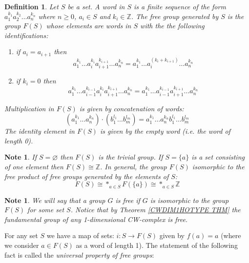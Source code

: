\documentclass[11pt, letterpaper, oneside]{report}
\theoremstyle{pplain}
\theoremstyle{ddefinition}
\newtheorem{definition}[theorem]{Definition}
\newtheorem{note}[theorem]{Note}
\theoremstyle{nnn}
\theoremstyle{eexercise}
\newcommand{\Z}{{\mathbb Z}}
\newcommand{\benu}{\begin{enumerate}}
\newcommand{\eenu}{\end{enumerate}}
\begin{document}
\begin{definition}
Let $S$ be a set. A \emph{word} in $S$ is a finite sequence of the form
$a_{1}^{k_{1}}a_{2}^{k_{2}} {\dots} a_{n}^{k_{n}}$
where $n\geq 0$,  $a_{i}\in S$ and $k_{i}\in \Z$. 
The \emph{free group generated by } $S$ is the group $F(S)$ whose elements
are words in $S$ with the the following identifications:
\benu
\item[\textbullet] if $a_{i} = a_{i+1}$ then
$$a_{1}^{k_{1}} {\dots}  a^{k_{i}}_{i} a^{k_{i+1}}_{i+1} {\dots} a_{n}^{k_{n}} = 
a_{1}^{k_{1}} {\dots} a_{i}^{(k_{i}+k_{i+1})} {\dots} a_{n}^{k_{n}}$$
\item[\textbullet] if $k_{i} = 0$ then 
$$a_{1}^{k_{1}} {\dots}  a_{i-1}^{k_{i-1}}a^{k_{i}}_{i} a^{k_{i+1}}_{i+1} {\dots} a_{n}^{k_{n}} = 
a_{1}^{k_{1}} {\dots}  a_{i-1}^{k_{i-1}}a^{k_{i+1}}_{i+1} {\dots} a_{n}^{k_{n}}$$
\eenu
Multiplication in $F(S)$ is given by concatenation of words: 
$$(a_{1}^{k_{1}}\dots a_{n}^{k_{n}})\cdot (b_{1}^{l_{1}}\dots b_{m}^{l_{m}}) = 
a_{1}^{k_{1}}\dots a_{n}^{k_{n}}b_{1}^{l_{1}}\dots b_{m}^{l_{m}}$$
The identity element in $F(S)$ is given by the empty word (i.e. the word of length 0).
\end{definition}


\begin{note}
If $S = \varnothing$ then $F(S)$ is the trivial group. 
If $S = \{a\}$ is a set consisting of one element then $F(S) \cong \Z$. 
 In general, the group 
$F(S)$ isomorphic to the free product of free groups generated by the elements of $S$:
$$F(S) \cong \ast_{a\in S} F(\{a\}) \cong \ast_{a\in S}\Z$$
\end{note}


\begin{note}
We will say that a group $G$ is free if $G$ is isomorphic to the group $F(S)$ for some set $S$. 
Notice that by Theorem \ref{CWDIM1HOTYPE THM} the fundamental group of any 1-dimensional 
CW-complex is free. 
\end{note}

For any set $S$ we have a map of sets: $i\colon  S \to F(S)$ given by $f(a) = a$
(where we consider $a\in F(S)$ as a word of length 1). The statement of the following fact is 
called the \emph{universal property of free groups}:
\end{document}
